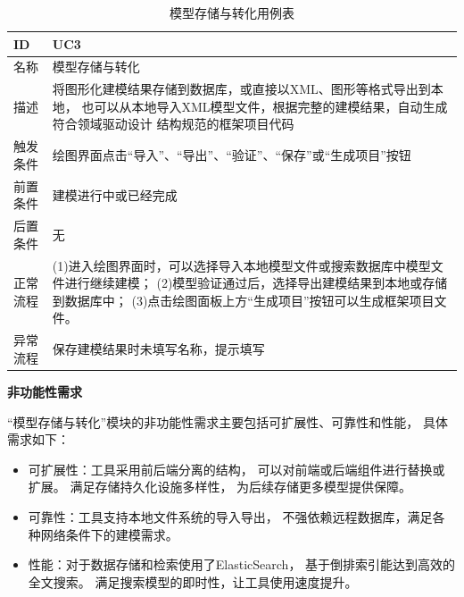 {\footnotesize
    \begin{longtable}[h]{m{80pt}|m{305pt}}
        \caption[模型存储与转化用例表]{模型存储与转化用例表} \label{usecase3} \\
            \hline  
            ID&UC3\\
            \hline
            名称&模型存储与转化\\
            \hline
            描述&将图形化建模结果存储到数据库，或直接以XML、图形等格式导出到本地，
            也可以从本地导入XML模型文件，根据完整的建模结果，自动生成符合领域驱动设计
            结构规范的框架项目代码\\
            \hline
            触发条件&绘图界面点击“导入”、“导出”、“验证”、“保存”或“生成项目”按钮\\
            \hline
            前置条件&建模进行中或已经完成\\
            \hline
            后置条件&无\\
            \hline
            正常流程& (1)进入绘图界面时，可以选择导入本地模型文件或搜索数据库中模型文件进行继续建模；
            \newline (2)模型验证通过后，选择导出建模结果到本地或存储到数据库中；
            \newline (3)点击绘图面板上方“生成项目”按钮可以生成框架项目文件。\\
            \hline
            异常流程&保存建模结果时未填写名称，提示填写\\
            \hline
        \end{longtable} 
}

\textbf{非功能性需求}

“模型存储与转化”模块的非功能性需求主要包括可扩展性、可靠性和性能，
具体需求如下：
        
        \begin{itemize}
            \item 可扩展性：工具采用前后端分离的结构，
            可以对前端或后端组件进行替换或扩展。
            满足存储持久化设施多样性，
            为后续存储更多模型提供保障。
        
            \item 可靠性：工具支持本地文件系统的导入导出，
            不强依赖远程数据库，满足各种网络条件下的建模需求。
           
             \item 性能：对于数据存储和检索使用了ElasticSearch，
             基于倒排索引能达到高效的全文搜索\cite{divya2013elasticsearch}。
             满足搜索模型的即时性，让工具使用速度提升。
        \end{itemize}

